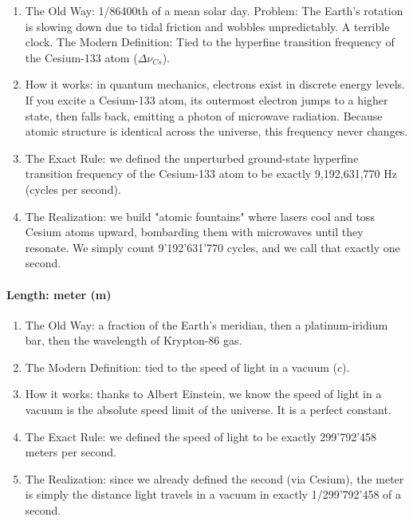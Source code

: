 \documentclass[../main.tex]{subfiles}
\begin{document}
\begin{enumerate}
	\item[\textbf{-}] The Old Way: 1/86400th of a mean solar day. Problem: The Earth’s rotation is slowing down due to tidal friction and wobbles unpredictably. A terrible clock. The Modern Definition: Tied to the hyperfine transition frequency of the Cesium-133 atom ($\Delta\nu_{Cs}$).
	\item[\textbf{-}] How it works: in quantum mechanics, electrons exist in discrete energy levels. If you excite a Cesium-133 atom, its outermost electron jumps to a higher state, then falls back, emitting a photon of microwave radiation. Because atomic structure is identical across the universe, this frequency never changes.
	\item[\textbf{-}] The Exact Rule: we defined the unperturbed ground-state hyperfine transition frequency of the Cesium-133 atom to be exactly 9,192,631,770 Hz (cycles per second).
	\item[\textbf{-}] The Realization: we build "atomic fountains" where lasers cool and toss Cesium atoms upward, bombarding them with microwaves until they resonate. We simply count 9'192'631'770 cycles, and we call that exactly one second.
\end{enumerate}

\paragraph{Length: meter (m)}

\begin{enumerate}
	\item[\textbf{-}] The Old Way: a fraction of the Earth's meridian, then a platinum-iridium bar, then the wavelength of Krypton-86 gas.
	\item[\textbf{-}] The Modern Definition: tied to the speed of light in a vacuum ($c$).
	\item[\textbf{-}] How it works: thanks to Albert Einstein, we know the speed of light in a vacuum is the absolute speed limit of the universe. It is a perfect constant.
	\item[\textbf{-}] The Exact Rule: we defined the speed of light to be exactly 299'792'458 meters per second.
	\item[\textbf{-}] The Realization: since we already defined the second (via Cesium), the meter is simply the distance light travels in a vacuum in exactly 1/299'792'458 of a second.
\end{enumerate}
\end{document}
